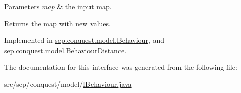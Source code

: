 \begin{DoxyParams}{Parameters}
{\em map} & the input map. \\
\hline
\end{DoxyParams}
\begin{DoxyReturn}{Returns}
the map with new values. 
\end{DoxyReturn}


Implemented in \hyperlink{classsep_1_1conquest_1_1model_1_1_behaviour_abaf1df42c90d2c78dd4bd17a63d89374}{sep.conquest.model.Behaviour}, and \hyperlink{classsep_1_1conquest_1_1model_1_1_behaviour_distance_a351d79be7ec3599134f3a15bc39fbc2e}{sep.conquest.model.BehaviourDistance}.



The documentation for this interface was generated from the following file:\begin{DoxyCompactItemize}
\item 
src/sep/conquest/model/\hyperlink{_i_behaviour_8java}{IBehaviour.java}\end{DoxyCompactItemize}
